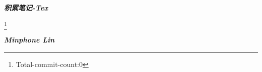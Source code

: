 
\begin{titlepage}
    \vspace*{\fill}
    \begin{center}
        {\Huge\textsl{\textbf{积累笔记-Tex}}}

        \bigskip
        {}\footnote{Total-commit-count:0} %

        \bigskip
        {\small\textsl{\textbf{Minphone Lin}}}

    \end{center}
\end{titlepage}


